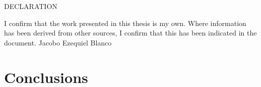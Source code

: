 \documentclass[11pt,a4paper]{report}
\renewcommand{\chaptermark}[1]{\markboth{#1}{}}
\renewcommand{\sectionmark}[1]{\markright{\thesection\ #1}{}}
\renewcommand{\plainfootrulewidth}{0pt}%
\renewcommand{\baselinestretch}{1.5}
\begin{document}
\newpage
\begin{center}
\vspace{3cm}
{\LARGE DECLARATION} \newline
\vspace*{1cm}
\end{center}
I confirm that the work presented in this thesis is my own. Where information has been derived from other sources, I confirm that this has been indicated in the document.
Jacobo Ezequiel Blanco

\newpage

\begin{abstract}

\end{abstract}

\thispagestyle{empty}
\begin{center}
\end{center}
\vspace{1cm}

\tableofcontents
\listoffigures
\listoftables

\newpage

\pagestyle{fancy}
\addtolength{\headwidth}{\marginparsep}
\renewcommand{\chaptermark}[1]{\markboth{#1}{}}
\renewcommand{\sectionmark}[1]{\markright{\thesection\ #1}{}}
\fancyfoot[RO,R]{\thepage}
\fancyhead[RO]{\leftmark}
\fancyhead[LO]{\rightmark}
\cfoot{}

\fancypagestyle{plain}{\renewcommand{\headrulewidth}{0pt}%
       \renewcommand{\plainfootrulewidth}{0pt}%
        \fancyhead[RO,LO]{}}
\renewcommand{\baselinestretch}{1.5} 

\newpage









\chapter{Conclusions} \label{prt:conclusions}

\begin{appendices}


\end{appendices}

\newpage


\end{document}
